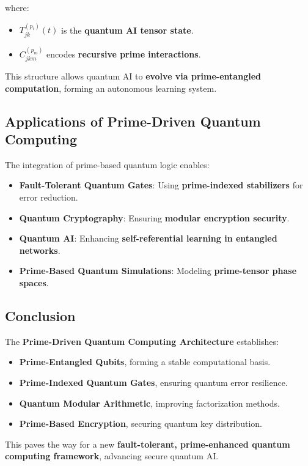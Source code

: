 \documentclass{article}
\theoremstyle{plain}
\theoremstyle{plain}
\theoremstyle{definition}
\theoremstyle{remark}
\begin{document}
where:
\begin{itemize}
    \item $T_{jk}^{(p_i)}(t)$ is the \textbf{quantum AI tensor state}.
    \item $C_{jkm}^{(p_m)}$ encodes \textbf{recursive prime interactions}.
\end{itemize}

This structure allows quantum AI to \textbf{evolve via prime-entangled computation}, forming an autonomous learning system.

\subsection{Applications of Prime-Driven Quantum Computing}

The integration of prime-based quantum logic enables:
\begin{itemize}
    \item \textbf{Fault-Tolerant Quantum Gates}: Using \textbf{prime-indexed stabilizers} for error reduction.
    \item \textbf{Quantum Cryptography}: Ensuring \textbf{modular encryption security}.
    \item \textbf{Quantum AI}: Enhancing \textbf{self-referential learning in entangled networks}.
    \item \textbf{Prime-Based Quantum Simulations}: Modeling \textbf{prime-tensor phase spaces}.
\end{itemize}

\subsection{Conclusion}

The \textbf{Prime-Driven Quantum Computing Architecture} establishes:
\begin{itemize}
    \item \textbf{Prime-Entangled Qubits}, forming a stable computational basis.
    \item \textbf{Prime-Indexed Quantum Gates}, ensuring quantum error resilience.
    \item \textbf{Quantum Modular Arithmetic}, improving factorization methods.
    \item \textbf{Prime-Based Encryption}, securing quantum key distribution.
\end{itemize}

This paves the way for a new \textbf{fault-tolerant, prime-enhanced quantum computing framework}, advancing secure quantum AI.
\end{document}
